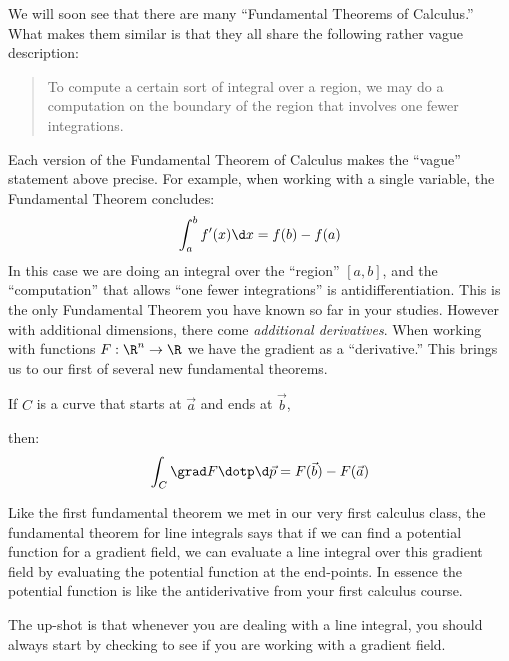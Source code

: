 \documentclass{ximera}
\begin{document}
We will soon see that there are many ``Fundamental Theorems of
Calculus.'' What makes them similar is that they all share the
following rather vague description:
\begin{quote}
  To compute a certain sort of integral over a region, we may do a
  computation on the boundary of the region that involves one fewer
  integrations.
\end{quote}

Each version of the Fundamental Theorem of Calculus makes the
``vague'' statement above precise. For example, when working with a
single variable, the Fundamental Theorem concludes:
\[
\int_a^b f'(x) \d x = f(b) - f(a)
\]
In this case we are doing an integral over the ``region'' $[a,b]$, and
the ``computation'' that allows ``one fewer integrations'' is
antidifferentiation. This is the only Fundamental Theorem you have
known so far in your studies.  However with additional dimensions,
there come \textit{additional derivatives}. When working with functions
$F:\R^n\to\R$ we have the gradient as a ``derivative.'' This brings us
to our first of several new fundamental theorems.

\begin{theorem}
  If $C$ is a curve that starts at $\vec{a}$ and ends at $\vec{b}$,
    \begin{image}
\end{image}
  then:
  \[
  \int_C \grad F\dotp \d \vec{p} = F(\vec{b}) - F(\vec{a})
  \]
\end{theorem}

Like the first fundamental theorem we met in our very first calculus
class, the fundamental theorem for line integrals says that if we can
find a potential function for a gradient field, we can evaluate a line
integral over this gradient field by evaluating the potential function
at the end-points. In essence the potential function is like the
antiderivative from your first calculus course.


The up-shot is that whenever you are dealing with a line integral, you
should always start by checking to see if you are working with a
gradient field.
\end{document}
